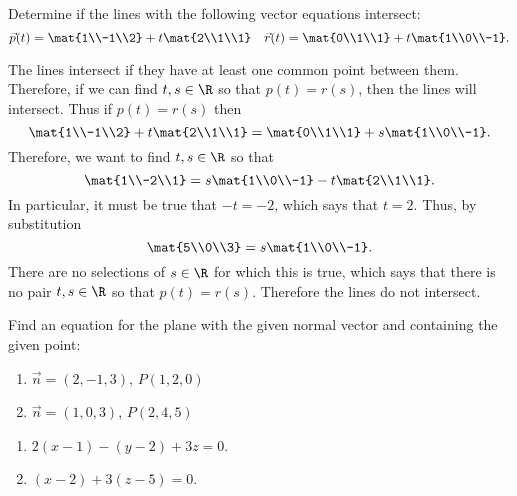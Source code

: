 \begin{exercises}
\begin{problist}
        \prob   Determine if the lines with the following vector equations intersect:
        \[
            \vec{p}(t) = \mat{1\\-1\\2} + t\mat{2\\1\\1} \quad
            \vec{r}(t) = \mat{0\\1\\1} + t\mat{1\\0\\-1}.
        \]
        \begin{solution}
            The lines intersect if they have at least one common point between them. Therefore, if we
            can find $t, s \in \R$ so that $p(t) = r(s)$, then the lines will intersect. Thus if $p(t) =
            r(s)$ then
            \[
                \mat{1\\-1\\2} + t\mat{2\\1\\1} = \mat{0\\1\\1} + s\mat{1\\0\\-1}.  
            \]
            Therefore, we want to find $t, s \in \R$ so that
            \[
                \mat{1\\-2\\1} = s\mat{1\\0\\-1} - t\mat{2\\1\\1}.
            \]
            In particular, it must be true that $-t = -2$, which says that $t = 2$. Thus, by
            substitution
            \[
                \mat{5\\0\\3} = s\mat{1\\0\\-1}.  
            \]
            There are no selections of $s \in \R$ for which this is true, which says that there is no
            pair $t,s \in \R$ so that $p(t) = r(s)$. Therefore the lines do not intersect.
        \end{solution}

        \prob   Find an equation for the plane with the given normal vector and containing the given
        point:
        \begin{enumerate}
            \item   $\vec{n} = (2, -1, 3)$, $P(1, 2, 0)$
            \item   $\vec{n} = (1, 0, 3)$, $P(2, 4, 5)$
        \end{enumerate}
        \begin{solution}
            \begin{enumerate}
                \item   $2(x-1) - (y-2) + 3z = 0$.
                \item   $(x-2) + 3(z-5) = 0$.
            \end{enumerate}
        \end{solution}


\end{problist}
\end{exercises}
